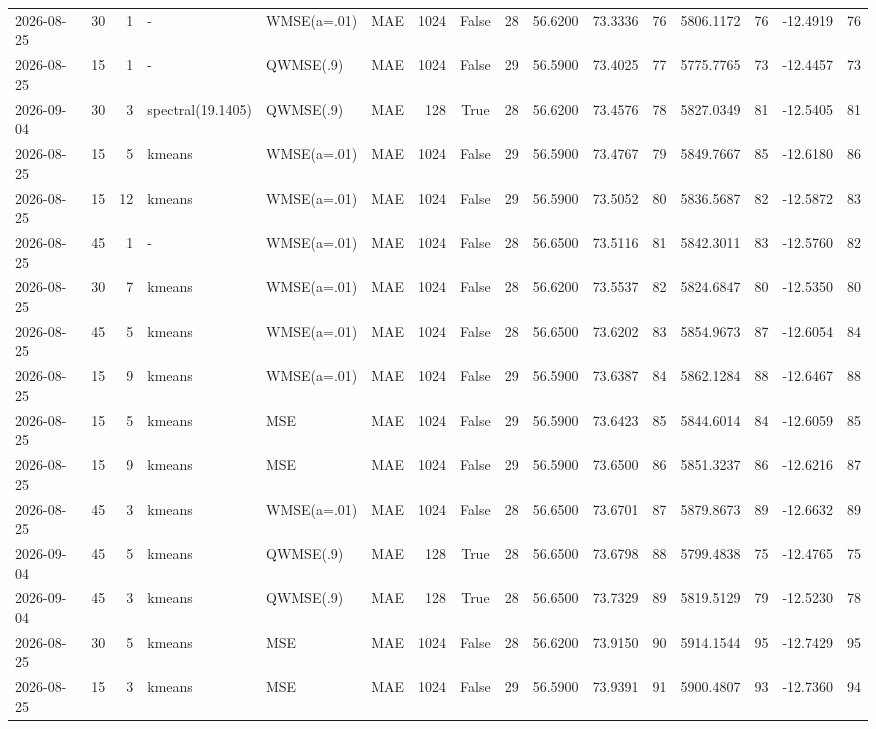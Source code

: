 \documentclass[10pt]{article}
\begin{document}
\begin{landscape}
\begin{longtable}{@{}lrrlllrcrrrrrrrr@{}}
2026-08-25 & 30 & 1 & - & WMSE(a=.01) & MAE & 1024 & False & 28 & 56.6200 & 73.3336 & 76 & 5806.1172 & 76 & -12.4919 & 76 \\
2026-08-25 & 15 & 1 & - & QWMSE(.9) & MAE & 1024 & False & 29 & 56.5900 & 73.4025 & 77 & 5775.7765 & 73 & -12.4457 & 73 \\
2026-09-04 & 30 & 3 & spectral(19.1405) & QWMSE(.9) & MAE & 128 & True & 28 & 56.6200 & 73.4576 & 78 & 5827.0349 & 81 & -12.5405 & 81 \\
2026-08-25 & 15 & 5 & kmeans & WMSE(a=.01) & MAE & 1024 & False & 29 & 56.5900 & 73.4767 & 79 & 5849.7667 & 85 & -12.6180 & 86 \\
2026-08-25 & 15 & 12 & kmeans & WMSE(a=.01) & MAE & 1024 & False & 29 & 56.5900 & 73.5052 & 80 & 5836.5687 & 82 & -12.5872 & 83 \\
2026-08-25 & 45 & 1 & - & WMSE(a=.01) & MAE & 1024 & False & 28 & 56.6500 & 73.5116 & 81 & 5842.3011 & 83 & -12.5760 & 82 \\
2026-08-25 & 30 & 7 & kmeans & WMSE(a=.01) & MAE & 1024 & False & 28 & 56.6200 & 73.5537 & 82 & 5824.6847 & 80 & -12.5350 & 80 \\
2026-08-25 & 45 & 5 & kmeans & WMSE(a=.01) & MAE & 1024 & False & 28 & 56.6500 & 73.6202 & 83 & 5854.9673 & 87 & -12.6054 & 84 \\
2026-08-25 & 15 & 9 & kmeans & WMSE(a=.01) & MAE & 1024 & False & 29 & 56.5900 & 73.6387 & 84 & 5862.1284 & 88 & -12.6467 & 88 \\
2026-08-25 & 15 & 5 & kmeans & MSE & MAE & 1024 & False & 29 & 56.5900 & 73.6423 & 85 & 5844.6014 & 84 & -12.6059 & 85 \\
2026-08-25 & 15 & 9 & kmeans & MSE & MAE & 1024 & False & 29 & 56.5900 & 73.6500 & 86 & 5851.3237 & 86 & -12.6216 & 87 \\
2026-08-25 & 45 & 3 & kmeans & WMSE(a=.01) & MAE & 1024 & False & 28 & 56.6500 & 73.6701 & 87 & 5879.8673 & 89 & -12.6632 & 89 \\
2026-09-04 & 45 & 5 & kmeans & QWMSE(.9) & MAE & 128 & True & 28 & 56.6500 & 73.6798 & 88 & 5799.4838 & 75 & -12.4765 & 75 \\
2026-09-04 & 45 & 3 & kmeans & QWMSE(.9) & MAE & 128 & True & 28 & 56.6500 & 73.7329 & 89 & 5819.5129 & 79 & -12.5230 & 78 \\
2026-08-25 & 30 & 5 & kmeans & MSE & MAE & 1024 & False & 28 & 56.6200 & 73.9150 & 90 & 5914.1544 & 95 & -12.7429 & 95 \\
2026-08-25 & 15 & 3 & kmeans & MSE & MAE & 1024 & False & 29 & 56.5900 & 73.9391 & 91 & 5900.4807 & 93 & -12.7360 & 94 \\

\end{longtable}
\end{landscape}
\end{document}
